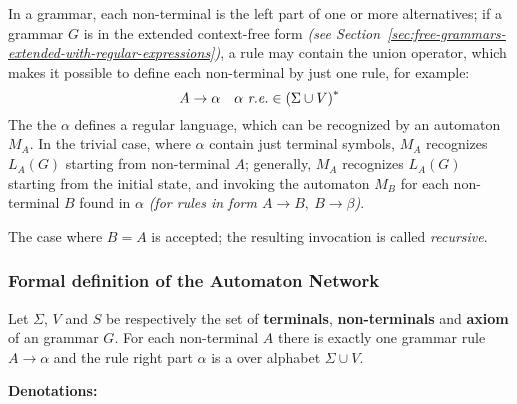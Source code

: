 \documentclass[english]{article}
\begin{document}
\bigskip
In a grammar, each non-terminal is the left part of one or more alternatives;
if a grammar \(G\) is in the extended context-free form \textit{(see Section~\ref{sec:free-grammars-extended-with-regular-expressions})}, a rule \RP may contain the union operator, which makes it possible to define each non-terminal by just one rule, for example:
\[ A \rightarrow \alpha \quad \alpha \ \textit{r.e.} \in \left( \Sigma \cup V \right)^\ast \]
The the \re \(\alpha\) defines a regular language, which can be recognized by an automaton \(M_A\).
In the trivial case, where \(\alpha\) contain just terminal symbols, \(M_A\) recognizes \(L_A(G)\) starting from non-terminal \(A\);
generally, \(M_A\) recognizes \(L_A(G)\) starting from the initial state, and invoking the automaton \(M_{B}\) for each non-terminal \(B\) found in \(\alpha\) \textit{(for rules in form \(A \rightarrow B,\  B \rightarrow \beta\))}.

The case where \(B = A\) is accepted; the resulting invocation is called \textit{recursive}.

\subsubsection{Formal definition of the Automaton Network}

Let \(\Sigma\), \(V\) and \(S\) be respectively the set of \textbf{terminals}, \textbf{non-terminals} and \textbf{axiom} of an \EBNF grammar \(G\).
For each non-terminal \(A\) there is exactly one grammar rule \(A \rightarrow \alpha\) and the rule right part \(\alpha\) is a \re over alphabet \(\Sigma \cup V\).

\textbf{Denotations:}
\end{document}
